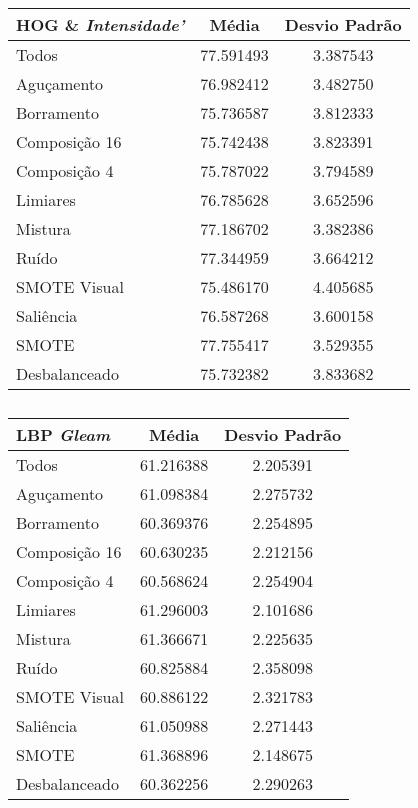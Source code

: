 \begin{table}[!htbp]
\centering
\caption{}
\label{tab:resultados:x:melhor}
\begin{tabular}{|l|c|c|}
\hline
\textbf{HOG \& \emph{Intensidade'}} & \textbf{Média}     & \textbf{Desvio Padrão} \\ \hline
   Todos        &  77.591493 &  3.387543  \\ \hline
  Aguçamento    &  76.982412 &  3.482750  \\ \hline
  Borramento    &  75.736587 &  3.812333  \\ \hline
  Composição 16 &  75.742438 &  3.823391  \\ \hline
  Composição 4  &  75.787022 &  3.794589  \\ \hline
  Limiares      &  76.785628 &  3.652596  \\ \hline
  Mistura       &  77.186702 &  3.382386  \\ \hline
  Ruído         &  77.344959 &  3.664212  \\ \hline
  SMOTE Visual  &  75.486170 &  4.405685  \\ \hline
  Saliência     &  76.587268 &  3.600158  \\ \hline
 SMOTE          &  77.755417 &  3.529355  \\ \hline
Desbalanceado   &  75.732382 &  3.833682  \\ \hline
\end{tabular}
\end{table}

\begin{table}[!htbp]
\centering
\caption{}
\label{tab:resultados:x:melhor}
\begin{tabular}{|l|c|c|}
\hline
\textbf{LBP \emph{Gleam}} & \textbf{Média}     & \textbf{Desvio Padrão} \\ \hline
   Todos        &  61.216388 &  2.205391  \\ \hline
  Aguçamento    &  61.098384 &  2.275732  \\ \hline
  Borramento    &  60.369376 &  2.254895  \\ \hline
  Composição 16 &  60.630235 &  2.212156  \\ \hline
  Composição 4  &  60.568624 &  2.254904  \\ \hline
  Limiares      &  61.296003 &  2.101686  \\ \hline
  Mistura       &  61.366671 &  2.225635  \\ \hline
  Ruído         &  60.825884 &  2.358098  \\ \hline
  SMOTE Visual  &  60.886122 &  2.321783  \\ \hline
  Saliência     &  61.050988 &  2.271443  \\ \hline
 SMOTE          &  61.368896 &  2.148675  \\ \hline
Desbalanceado   &  60.362256 &  2.290263  \\ \hline
\end{tabular}
\end{table}

